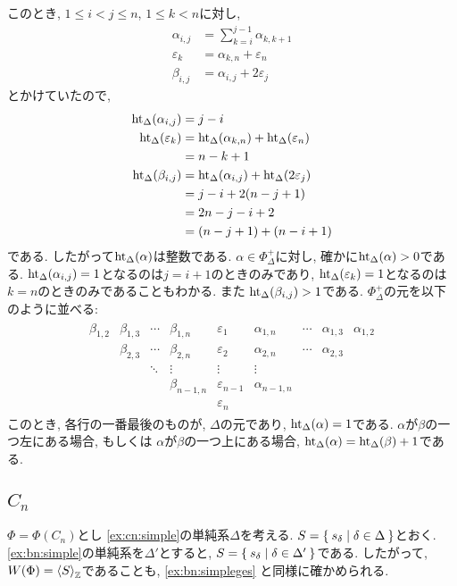 このとき, $1\leq i<j\leq n$, $1\leq k<n$に対し,
\begin{align*}
\alpha_{i,j}&=\sum_{k=i}^{j-1}\alpha_{k,k+1}\\
\varepsilon_{k}&=\alpha_{k,n}+\varepsilon_{n}\\
\beta_{i,j}&=\alpha_{i,j}+2\varepsilon_{j}
\end{align*}
とかけていたので,
\begin{align*}
\operatorname{ht}_\Delta(\alpha_{i,j})&=j-i\\
\operatorname{ht}_\Delta(\varepsilon_{k})&=\operatorname{ht}_\Delta(\alpha_{k,n})+\operatorname{ht}_\Delta(\varepsilon_{n})\\
&=n-k+1\\
\operatorname{ht}_\Delta(\beta_{i,j})&=
\operatorname{ht}_\Delta(\alpha_{i,j})+\operatorname{ht}_\Delta(2\varepsilon_{j})\\
&=j-i+2(n-j+1)\\
&=2n-j-i+2\\
&=(n-j+1)+(n-i+1)
\end{align*}
である.
したがって$\operatorname{ht}_\Delta(\alpha)$は整数である.
$\alpha\in\Phi_\Delta^+$に対し, 確かに$\operatorname{ht}_{\Delta}(\alpha)>0$である.
$\operatorname{ht}_\Delta(\alpha_{i,j})=1$となるのは$j=i+1$のときのみであり,
$\operatorname{ht}_\Delta(\varepsilon_{k})=1$となるのは$k=n$のときのみであることもわかる.
また
$\operatorname{ht}_\Delta(\beta_{i,j})>1$である.
$\Phi_\Delta^+$の元を以下のように並べる:
\begin{align*}
  \begin{array}{ccccccccc}
    \beta_{1,2}&\beta_{1,3}&\cdots&\beta_{1,n}&
    \varepsilon_{1}&\alpha_{1,n}&\cdots&\alpha_{1,3}&\alpha_{1,2}\\
    &\beta_{2,3}&\cdots&\beta_{2,n}&
    \varepsilon_{2}&\alpha_{2,n}&\cdots&\alpha_{2,3}\\
    &&\ddots&\vdots&
    \vdots      &\vdots&&\\
    &&&\beta_{n-1,n}&
    \varepsilon_{n-1}&\alpha_{n-1,n}\\
    &&&&
    \varepsilon_{n}
  \end{array}
\end{align*}
このとき, 各行の一番最後のものが, $\Delta$の元であり,
$\operatorname{ht}_\Delta(\alpha)=1$である.
$\alpha$が$\beta$の一つ左にある場合,
もしくは
$\alpha$が$\beta$の一つ上にある場合,
$\operatorname{ht}_\Delta(\alpha)=\operatorname{ht}_\Delta(\beta)+1$である.





\subsection{$C_{n}$}
$\Phi=\Phi(C_n)$とし
\cref{ex:cn:simple}の単純系$\Delta$を考える.
$S=\Set{s_\delta|\delta\in \Delta}$とおく.
\cref{ex:bn:simple}の単純系を$\Delta'$とすると,
$S=\Set{s_\delta|\delta\in \Delta'}$である.
したがって, 
$W(\Phi)=\Braket{S}_{\mathbb{Z}}$であることも,
\cref{ex:bn:simpleges}
と同様に確かめられる.

